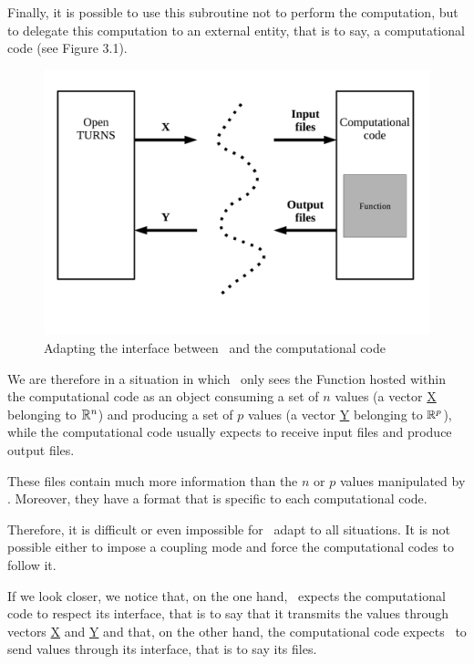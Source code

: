 Finally, it is possible to use this subroutine not to perform the computation, but to delegate this computation to an external entity, that is to say, a computational code (see Figure 3.1).

\begin{figure}
\begin{center}
\includegraphics[width=12cm]{Figures/wrapper/Figure1.pdf}
\caption[Figure 1]{Adapting the interface between \OT\ and the computational code}
\end{center}
\end{figure}

We are therefore in a situation in which \OT\ only sees the Function hosted within the computational code as an object consuming a set of $n$ values (a vector \underline{X} belonging to ${\mathbb R}^{n}$) and producing a set of $p$ values (a vector \underline{Y} belonging to ${\mathbb R}^{p}$), while the computational code usually expects to receive input files and produce output files.

These files contain much more information than the $n$ or $p$ values manipulated by \OT. Moreover, they have a format that is specific to each computational code.

Therefore, it is difficult or even impossible for \OT\ adapt to all situations. It is not possible either to impose a coupling mode and force the computational codes to follow it.

If we look closer, we notice that, on the one hand, \OT\ expects the computational code to respect its interface, that is to say that it transmits the values through vectors \underline{X} and \underline{Y} and that, on the other hand, the computational code expects \OT\ to send values through its interface, that is to say its files.

